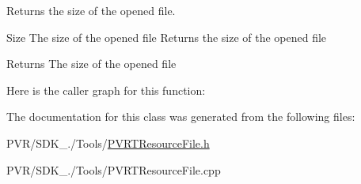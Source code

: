 Returns the size of the opened file. 



  Size  The size of the opened file  Returns the size of the opened file





\begin{DoxyReturn}{Returns}
The size of the opened file 
\end{DoxyReturn}


Here is the caller graph for this function\+:




The documentation for this class was generated from the following files\+:\begin{DoxyCompactItemize}
\item 
P\+V\+R/\+S\+D\+K\+\_./\+Tools/\hyperlink{_p_v_r_t_resource_file_8h}{P\+V\+R\+T\+Resource\+File.\+h}\item 
P\+V\+R/\+S\+D\+K\+\_./\+Tools/P\+V\+R\+T\+Resource\+File.\+cpp\end{DoxyCompactItemize}
